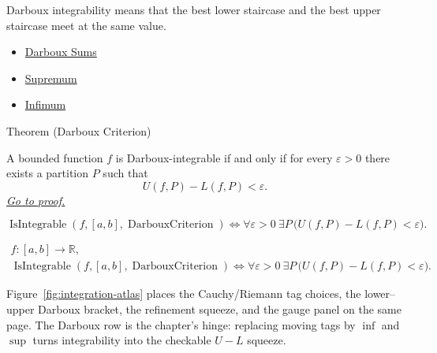 \begin{remark*}[Interpretation]
Darboux integrability means that the best lower staircase and the best upper
staircase meet at the same value.
\end{remark*}

\begin{dependencies}
\begin{itemize}
  \item \hyperref[def:darboux-sums]{Darboux Sums}
  \item \hyperref[def:supremum]{Supremum}
  \item \hyperref[def:infimum]{Infimum}
\end{itemize}
\end{dependencies}

\begin{theorembox}{Theorem (Darboux Criterion)}
\begin{theorem}
\label{thm:darboux-criterion}
A bounded function \(f\) is Darboux-integrable if and only if for every
\(\varepsilon>0\) there exists a partition \(P\) such that
\[
  U(f,P)-L(f,P)<\varepsilon.
\]
\hyperref[prf:darboux-criterion]{\textit{Go to proof.}}
\end{theorem}
\end{theorembox}

\begin{remark*}
\[
\operatorname{IsIntegrable}(f,[a,b],\operatorname{DarbouxCriterion})
\Longleftrightarrow
\forall\varepsilon>0\ \exists P\,
\bigl(U(f,P)-L(f,P)<\varepsilon\bigr).
\]
\end{remark*}

\begin{remark*}
\[
\begin{aligned}
  f\colon [a,b]\to\mathbb{R},\\
\operatorname{IsIntegrable}(f,[a,b],\operatorname{DarbouxCriterion})
\Longleftrightarrow
\forall\varepsilon>0\ \exists P\,
\bigl(U(f,P)-L(f,P)<\varepsilon\bigr).
\end{aligned}
\]
\end{remark*}

\begin{remark*}[Interpretation]
Figure~\ref{fig:integration-atlas} places the Cauchy/Riemann tag choices,
the lower--upper Darboux bracket, the refinement squeeze, and the gauge panel
on the same page. The Darboux row is the chapter's hinge: replacing moving
tags by \(\inf\) and \(\sup\) turns integrability into the checkable
\(U-L\) squeeze.
\end{remark*}

